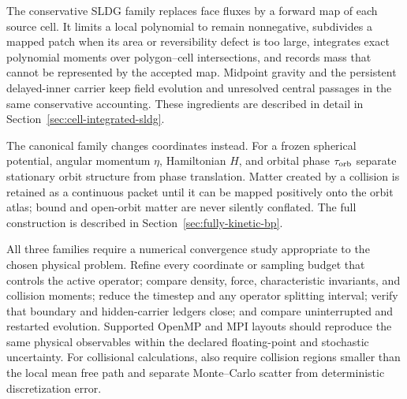 The conservative SLDG family replaces face fluxes by a forward map of each
source cell.  It limits a local polynomial to remain nonnegative, subdivides
a mapped patch when its area or reversibility defect is too large, integrates
exact polynomial moments over polygon--cell intersections, and records mass
that cannot be represented by the accepted map.  Midpoint gravity and the
persistent delayed-inner carrier keep field evolution and unresolved central
passages in the same conservative accounting.  These ingredients are
described in detail in Section~\ref{sec:cell-integrated-sldg}.

The canonical family changes coordinates instead.  For a frozen spherical
potential, angular momentum \(\eta\), Hamiltonian \(H\), and orbital phase
\(\tau_{\rm orb}\) separate stationary orbit structure from phase translation.  Matter
created by a collision is retained as a continuous packet until it can be
mapped positively onto the orbit atlas; bound and open-orbit matter are never
silently conflated.  The full construction is described in
Section~\ref{sec:fully-kinetic-bp}.

All three families require a numerical convergence study appropriate to the
chosen physical problem.  Refine every coordinate or sampling budget that
controls the active operator; compare density, force, characteristic
invariants, and collision moments; reduce the timestep and any operator
splitting interval; verify that boundary and hidden-carrier ledgers close;
and compare uninterrupted and restarted evolution.  Supported OpenMP and MPI
layouts should reproduce the same physical observables within the declared
floating-point and stochastic uncertainty.  For collisional calculations,
also require collision regions smaller than the local mean free path and
separate Monte--Carlo scatter from deterministic discretization error.
